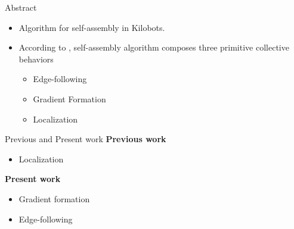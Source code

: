 \begin{frame}{Abstract}
\begin{itemize}
    \item Algorithm for self-assembly in Kilobots.
    \item According to \cite{MR-AC-RN:2014}, self-assembly algorithm composes three primitive collective behaviors 
    \begin{itemize}
        \item Edge-following
        \item Gradient Formation
        \item Localization 
    \end{itemize}
    
\end{itemize}
\end{frame}

\begin{frame}{Previous and Present work}
\textbf{Previous work}
\begin{itemize}
    \item Localization
\end{itemize}
\textbf{Present work}
\begin{itemize}
    \item Gradient formation
    \item Edge-following
\end{itemize}

\end{frame}

